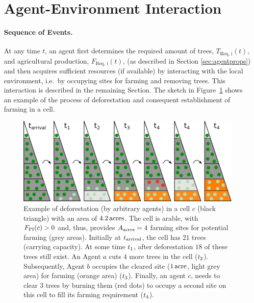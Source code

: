 \FloatBarrier
\section{Agent-Environment Interaction} \label{sec:Harvest}
\paragraph{Sequence of Events.}
At any time $t$, an agent first determines the required amount of trees, $T_\text{Req, i}(t)$, and agricultural production, $F_\text{Req, i}(t)$, (as described in Section \ref{sec:agentprops}) and then acquires sufficient resources (if available) by interacting with the local environment, i.e.\ by occupying sites for farming and removing trees.
This interaction is described in the remaining Section.
The sketch in Figure~\ref{fig:treeburning} shows an example of the process of deforestation and consequent establishment of farming in a cell.
\begin{figure}
	\centering
	\includegraphics[width=\textwidth]{images/SketchABM2/burningSketch_triangle.pdf}
	\caption{Example of deforestation (by arbitrary agents) in a cell $c$ (black triangle) with an area of $4.2\, \rm{acres}$.
		The cell is arable, with $F_{\rm PI}(c)>0$ and, thus, provides $A_{\rm acres}=4$ farming sites for potential farming (grey areas).
		Initially at $t_{\rm arrival}$, the cell has $21$ trees (carrying capacity).
		At some time $t_{\rm 1}$, after deforestation $18$ of these trees still exist. 
		An Agent $a$ cuts $4$ more trees in the cell (\ra $t_{\rm 2}$). 
		Subsequently, Agent $b$ occupies the cleared site ($1\, {\rm acre}$, light grey area) for farming (orange area) (\ra $t_{\rm 3}$). 
		Finally, an agent $c$, needs to clear $3$ trees by burning them (red dots) to occupy a second site on this cell to fill its farming requirement (\ra $t_{\rm 4}$).}
	\label{fig:treeburning}
\end{figure}

